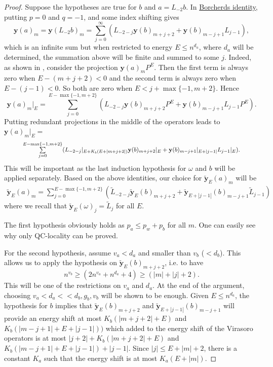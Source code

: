 \documentclass[twoside,11pt,titlepage]{amsart}
\renewcommand{\=}[1]{\stackrel{#1}{=}} %
\theoremstyle{definition}
\theoremstyle{remark}
\begin{document}
\begin{proof}
Suppose the hypotheses are true for $b$ and $a=L_{-2}b$. In \hyperref[1.1]{Borcherds identity}, putting $p=0$ and $q=-1$, and some index shifting gives
$${\textbf{y}}(a)_m={\textbf{y}}(L_{-2}b)_m=\sum_{j=0}^{\infty}(L_{-2-j}{\textbf{y}}(b)_{m+j+2}+{\textbf{y}}(b)_{m-j+1}L_{j-1}),$$
which is an infinite sum but when restricted to energy $E\le n^{d_a}$, where $d_a$ will be determined, the summation above will be finite and summed to some $j$. Indeed, as shown in \cite{carpi2015vertex}, consider the projection ${\textbf{y}}(a)_mP^{E}$. Then the first term is always zero when $E-(m+j+2)<0$ and the second term is always zero when $E-(j-1)<0$. So both are zero when $E<j+\max\{-1,m+2\}$. Hence
$${\textbf{y}}(a)_m|_E= \sum_{j=0}^{E-\max\{-1,m+2\}}(L_{-2-j}{\textbf{y}}(b)_{m+j+2}P^{E}+{\textbf{y}}(b)_{m-j+1}L_{j-1}P^{E}).$$
Putting redundant projections in the middle of the operators leads to ${\textbf{y}}(a)_m|_E=$
\begin{gather}\label{eq12}
\scalebox{0.86}{$\sum\limits_{j=0}^{E-\max\{-1,m+2\}}(L_{-2-j}|_{E+K_b(E+|m+j+2|)}{\textbf{y}}(b)_{m+j+2}|_E+{\textbf{y}}(b)_{m-j+1}|_{E+|j-1|}L_{j-1}|_{E}).$}
\end{gather}
This will be important as the last induction hypothesis for $\omega$ and $b$ will be applied separately. Based on the above identities, our choice for $\widetilde{\textbf{y}}_E(a)_m$ will be 
\begin{align}\label{eq13}
\widetilde{\textbf{y}}_E(a)_m=   \sum_{j=0}^{E-\max\{-1,m+2\}}(\widetilde{L}_{-2-j}\widetilde{\textbf{y}}_{E}(b)_{m+j+2}+\widetilde{\textbf{y}}_{E+|j-1|}(b)_{m-j+1}\widetilde{L}_{j-1})
\end{align}
where we recall that $\widetilde{\textbf{y}}_E(\omega)_j=\widetilde{L}_j$ for all $E$. 

The first hypothesis obviously holds as $p_a\le p_w+p_b$ for all $m$. One can easily see why only QC-locality can be proved.

For the second hypothesis, assume $v_a<d_a$ and smaller than $v_b$ ($<d_b$). This allows us to apply the hypothesis on $\widetilde{\textbf{y}}_{E}(b)_{m+j+2}$, i.e. to have
$$n^{v_b} \ge (2n^{v_a}+n^{d_a}+4) \ge (|m|+|j|+2).$$
This will be one of the restrictions on $v_a$ and $d_a$. At the end of the argument, choosing $v_a<d_a << d_b,g_b,v_b$ will be shown to be enough. Given $E \le n^{d_a}$, the hypothesis for $b$ implies that $\widetilde{\textbf{y}}_E(b)_{m+j+2}$ and $\widetilde{\textbf{y}}_{E+|j-1|}(b)_{m-j+1}$ will provide an energy shift at most  $K_b(|m+j+2|+E)$ and $K_b(|m-j+1|+E+|j-1|))$ which added to the energy shift of the Virasoro operators is at most  $|j+2|+K_b(|m+j+2|+E)$ and $K_b(|m-j+1|+E+|j-1|)+|j-1|$. Since $|j| \le E+|m|+2$, there is a constant $K_a$ such that the energy shift is at most $K_a(E+|m|)$.


\end{proof}
\end{document}
